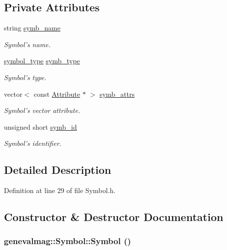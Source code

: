 \subsection*{Private Attributes}
\begin{CompactItemize}
\item 
string \hyperlink{classgenevalmag_1_1Symbol_72161dc9f286b5b4e18c4f849de52ebd}{symb\_\-name}
\begin{CompactList}\small\item\em Symbol's name. \item\end{CompactList}\item 
\hyperlink{namespacegenevalmag_4c1cf205cb145b09e46df5277bcc70c6}{symbol\_\-type} \hyperlink{classgenevalmag_1_1Symbol_a8557500c1049fa8605e3ecebb27f89c}{symb\_\-type}
\begin{CompactList}\small\item\em Symbol's type. \item\end{CompactList}\item 
vector$<$ const \hyperlink{classgenevalmag_1_1Attribute}{Attribute} $\ast$ $>$ \hyperlink{classgenevalmag_1_1Symbol_5085d920f7836a0b44993cc0e167e4c7}{symb\_\-attrs}
\begin{CompactList}\small\item\em Symbol's vector attribute. \item\end{CompactList}\item 
unsigned short \hyperlink{classgenevalmag_1_1Symbol_ea1a4b2cd5d6ddd60a0f4c68989c11bd}{symb\_\-id}
\begin{CompactList}\small\item\em Symbol's identifier. \item\end{CompactList}\end{CompactItemize}


\subsection{Detailed Description}


Definition at line 29 of file Symbol.h.

\subsection{Constructor \& Destructor Documentation}
\hypertarget{classgenevalmag_1_1Symbol_52c72b2631eb77cec685aae2bd61ab4d}{
\subsubsection[{Symbol}]{\setlength{\rightskip}{0pt plus 5cm}genevalmag::Symbol::Symbol ()}}
\label{classgenevalmag_1_1Symbol_52c72b2631eb77cec685aae2bd61ab4d}


